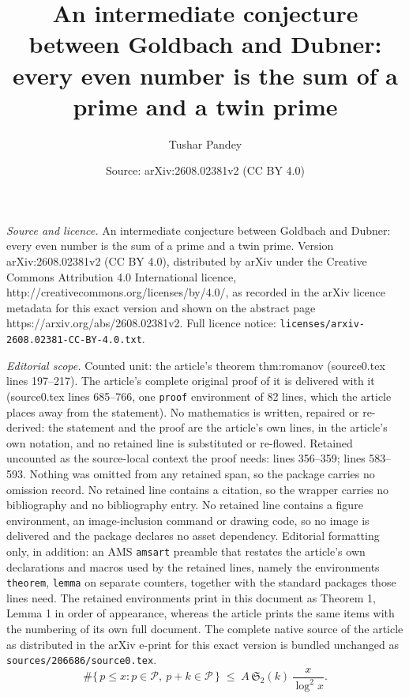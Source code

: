 \documentclass[10pt,a4paper]{amsart}
\title{An intermediate conjecture between Goldbach and Dubner:\\ every even number is the sum of a prime and a twin prime}
\author{Tushar Pandey}
\date{Source: arXiv:2608.02381v2 (CC BY 4.0)}
\newcommand{\PP}{\mathcal{P}}
\begin{document}
\maketitle

\noindent\emph{Source and licence.} An intermediate conjecture between Goldbach and Dubner:\\ every even number is the sum of a prime and a twin prime. Version arXiv:2608.02381v2 (CC BY 4.0), distributed by arXiv under the Creative Commons Attribution 4.0 International licence, http://creativecommons.org/licenses/by/4.0/, as recorded in the arXiv licence metadata for this exact version and shown on the abstract page https://arxiv.org/abs/2608.02381v2. Full licence notice: \texttt{licenses/arxiv-2608.02381-CC-BY-4.0.txt}.\par\smallskip

\noindent\textit{Editorial scope.} Counted unit: the article's theorem thm:romanov (source0.tex lines 197--217). The article's complete original proof of it is delivered with it (source0.tex lines 685--766, one \texttt{proof} environment of 82 lines, which the article places away from the statement). No mathematics is written, repaired or re-derived: the statement and the proof are the article's own lines, in the article's own notation, and no retained line is substituted or re-flowed.  Retained uncounted as the source-local context the proof needs: lines 356--359; lines 583--593.  Nothing was omitted from any retained span, so the package carries no omission record.  No retained line contains a citation, so the wrapper carries no bibliography and no bibliography entry.  No retained line contains a figure environment, an image-inclusion command or drawing code, so no image is delivered and the package declares no asset dependency.  Editorial formatting only, in addition: an AMS \texttt{amsart} preamble that restates the article's own declarations and macros used by the retained lines, namely the environments \texttt{theorem}, \texttt{lemma} on separate counters, together with the standard packages those lines need.  The retained environments print in this document as Theorem 1, Lemma 1 in order of appearance, whereas the article prints the same items with the numbering of its own full document.  The complete native source of the article as distributed in the arXiv e-print for this exact version is bundled unchanged as \texttt{sources/206686/source0.tex}.
\begin{equation}\label{eq:twinbound}
  \#\{\, p \le x : p \in \PP,\ p+k \in \PP \,\}
  \;\le\; A\,\mathfrak{S}_2(k)\,\frac{x}{\log^{2} x}.
\end{equation}
\end{document}
